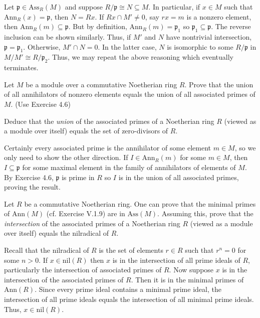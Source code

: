 \documentclass[../../master.tex]{subfiles}
\begin{document}
\begin{solution}
    Let $\mathfrak{p} \in \text{Ass}_R(M)$ and suppose $R / \mathfrak{p} \cong N \subseteq M$.
    In particular, if $x \in M$ such that $\text{Ann}_R(x) = \mathfrak{p}$, then $N = Rx$.
    If $Rx \cap M' \neq 0$, say $rx = m$ is a nonzero element, then $\text{Ann}_R(m) \subseteq \mathfrak{p}$.
    But by definition, $\text{Ann}_R(m) = \mathfrak{p}_1$ so $\mathfrak{p}_1 \subseteq \mathfrak{p}$.
    The reverse inclusion can be shown similarly.
    Thus, if $M'$ and $N$ have nontrivial intersection, $\mathfrak{p} = \mathfrak{p}_1$.
    Otherwise, $M' \cap N = 0$.
    In the latter case, $N$ is isomorphic to some $R / \mathfrak{p}$ in $M / M' \cong R / \mathfrak{p}_2$.
    Thus, we may repeat the above reasoning which eventually terminates.
\end{solution}

\begin{problem}
    Let $M$ be a module over a commutative Noetherian ring $R$.
    Prove that the union of all annihilators of nonzero elements equals the union of all associated primes of $M$.
    (Use Exercise 4.6)

    Deduce that the \textit{union} of the associated primes of a Noetherian ring $R$ (viewed as a module over itself) equals the set of zero-divisors of $R$.
\end{problem}

\begin{solution}
    Certainly every associated prime is the annihilator of some element $m \in M$, so we only need to show the other direction.
    If $I \in \text{Ann}_R(m)$ for some $m \in M$, then $I \subseteq \mathfrak{p}$ for some maximal element in the family of annihilators of elements of $M$.
    By Exercise 4.6, $\mathfrak{p}$ is prime in $R$ so $I$ is in the union of all associated primes, proving the result.
\end{solution}

\begin{problem}
    Let $R$ be a commutative Noetherian ring.
    One can prove that the minimal primes of $\text{Ann}(M)$ (cf. Exercise V.1.9) are in $\text{Ass}(M)$.
    Assuming this, prove that the \textit{intersection} of the associated primes of a Noetherian ring $R$ (viewed as a module over itself) equals the nilradical of $R$.
\end{problem}

\begin{solution}
    Recall that the nilradical of $R$ is the set of elements $r \in R$ such that $r^{n} = 0$ for some $n > 0$.
    If $x \in \text{nil}(R)$ then $x$ is in the intersection of all prime ideals of $R$, particularly the intersection of associated primes of $R$.
    Now suppose $x$ is in the intersection of the associated primes of $R$.
    Then it is in the minimal primes of $\text{Ann}(R)$.
    Since every prime ideal contains a minimal prime ideal, the intersection of all prime ideals equals the intersection of all minimal prime ideals.
    Thus, $x \in \text{nil}(R)$.
\end{solution}
\end{document}
